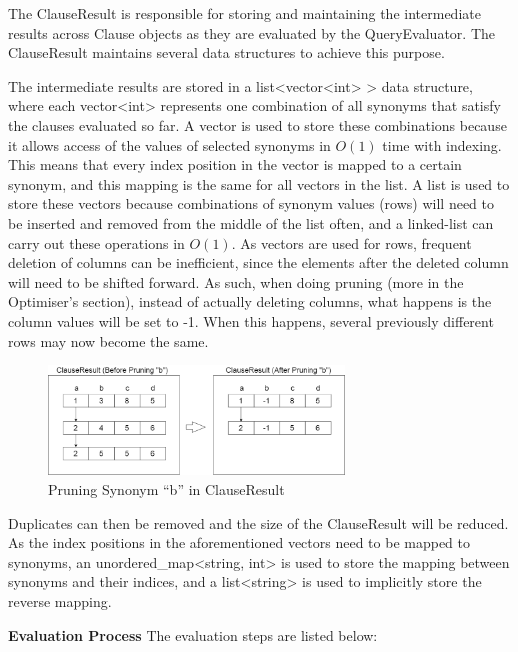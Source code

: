 \documentclass[12pt]{article}
\begin{document}
{{{{{{{{{{{{{The ClauseResult is responsible for storing and maintaining the intermediate results across Clause objects as they are evaluated by the QueryEvaluator. The ClauseResult maintains several data structures to achieve this purpose.

The intermediate results are stored in a list<vector<int> > data structure, where each vector<int> represents one combination of all synonyms that satisfy the clauses evaluated so far. A vector is used to store these combinations because it allows access of the values of selected synonyms in $O(1)$ time with indexing. This means that every index position in the vector is mapped to a certain synonym, and this mapping is the same for all vectors in the list. A list is used to store these vectors because combinations of synonym values (rows) will need to be inserted and removed from the middle of the list often, and a linked-list can carry out these operations in $O(1)$. As vectors are used for rows, frequent deletion of columns can be inefficient, since the elements after the deleted column will need to be shifted forward. As such, when doing pruning (more in the Optimiser’s section), instead of actually deleting columns, what happens is the column values will be set to -1. When this happens, several previously different rows may now become the same.
\begin{figure}[H]
  \centering 
  \caption{Pruning Synonym “b” in ClauseResult}
 \includegraphics[width=0.7\textwidth]{Pruning.png}
\end{figure}
Duplicates can then be removed and the size of the ClauseResult will be reduced.\newline
As the index positions in the aforementioned vectors need to be mapped to synonyms, an unordered\_map<string, int> is used to store the mapping between synonyms and their indices, and a list<string> is used to implicitly store the reverse mapping.


\textbf{Evaluation Process} \newline
The evaluation steps are listed below:

}}}}}}}}}}}}}
\end{document}
